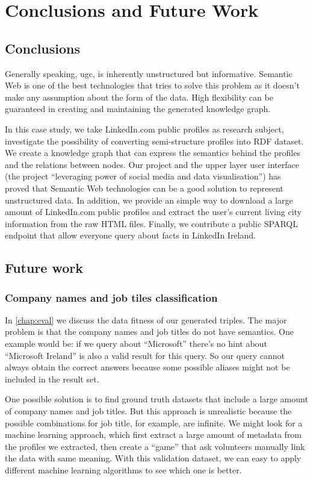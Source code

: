 \chapter{Conclusions and Future Work}

\section{Conclusions}
Generally speaking, \gls{ugc}, is inherently unstructured but informative. Semantic Web is one of the best technologies that tries to solve this problem as it doesn't make any assumption about the form of the data. High flexibility can be guaranteed in creating and maintaining the generated knowledge graph. 

In this case study, we take LinkedIn.com public profiles as research subject, investigate the possibility of converting semi-structure profiles into RDF dataset. We create a knowledge graph that can express the semantics behind the profiles and the relations between nodes. Our project and the upper layer user interface (the project ``leveraging power of social media and data visualisation'') has proved that Semantic Web technologies can be a good solution to represent unstructured data. In addition, we provide an simple way to download a large amount of LinkedIn.com public profiles and extract the user's current living city information from the raw HTML files. Finally, we contribute a public SPARQL endpoint that allow everyone query about facts in LinkedIn Ireland.

\section{Future work}
\subsection{Company names and job tiles classification}
In \autoref{chap:eval} we discuss the data fitness of our generated triples. The major problem is that the company names and job titles do not have semantics. One example would be: if we query about ``Microsoft'' there's no hint about ``Microsoft Ireland'' is also a valid result for this query. So our query cannot always obtain the correct answers because some possible aliases might not be included in the result set.

One possible solution is to find ground truth datasets that include a large amount of company names and job titles. But this approach is unrealistic because the possible combinations for job title, for example, are infinite. We might look for a machine learning approach, which first extract a large amount of metadata from the profiles we extracted, then create a ``game'' that ask volunteers manually link the data with same meaning. With this validation dataset, we can easy to apply different machine learning algorithms to see which one is better.


